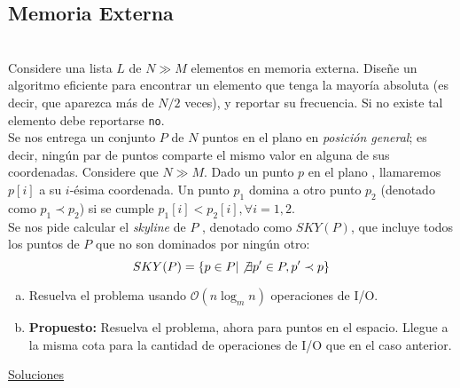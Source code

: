 \documentclass[dcc,uchile]{fcfmcourse}
\theoremstyle{plain}
\theoremstyle{definition}
\begin{document}
\begin{problems}
\section*{Memoria Externa}
\\
Considere una lista $L$ de $N \gg M$ elementos en memoria externa. Diseñe un algoritmo eficiente para encontrar un elemento que tenga la mayoría absoluta (es decir, que aparezca más de $N/2$ veces), y reportar su frecuencia. Si no existe tal elemento debe reportarse \texttt{no}.
\\
Se nos entrega un conjunto $P$ de $N$ puntos en el plano en \textit{posición general}; es decir, ningún par de puntos comparte el mismo valor en alguna de sus coordenadas. Considere que $N \gg M$. Dado un punto $p$ en el plano , llamaremos $p[i]$ a su $i$-ésima coordenada. Un punto $p_{1}$ domina a otro punto $p_{2}$ (denotado como $p_{1} \prec p_{2}$) si se cumple $p_{1}[i] < p_{2}[i], \forall i = 1, 2$.\\
Se nos pide calcular el \textit{skyline} de $P$ , denotado como $SKY (P)$, que incluye todos los puntos de $P$ que no son dominados por ningún otro:
\begin{equation*}
SKY(P) = \{p \in P | \not \exists p' \in P, p' \prec p\}    
\end{equation*}
\begin{enumerate}[a)]
\item Resuelva el problema usando $\mathcal{O}(n \log_{m} n)$ operaciones de I/O.
\item \textbf{Propuesto:} Resuelva el problema, ahora para puntos en el espacio. Llegue a la misma cota para la cantidad de operaciones de I/O que en el caso anterior.
\end{enumerate}
\end{problems}
\newpage
\begin{center}
{\huge \underline{Soluciones}}
\end{center}
\end{document}
